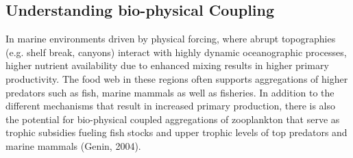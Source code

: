 \subsection{Understanding bio-physical Coupling}


In marine environments driven by physical forcing, where abrupt
topographies (e.g. shelf break, canyons) interact with highly dynamic
oceanographic processes, higher nutrient availability due to enhanced
mixing results in higher primary productivity.   The food web in these
regions often supports aggregations of higher predators such as fish,
marine mammals as well as fisheries. In addition to the different
mechanisms that result in increased primary production, there is also
the potential for bio-physical coupled aggregations of zooplankton that
serve as trophic subsidies fueling fish stocks and upper trophic levels
of top predators and marine mammals (Genin, 2004).

